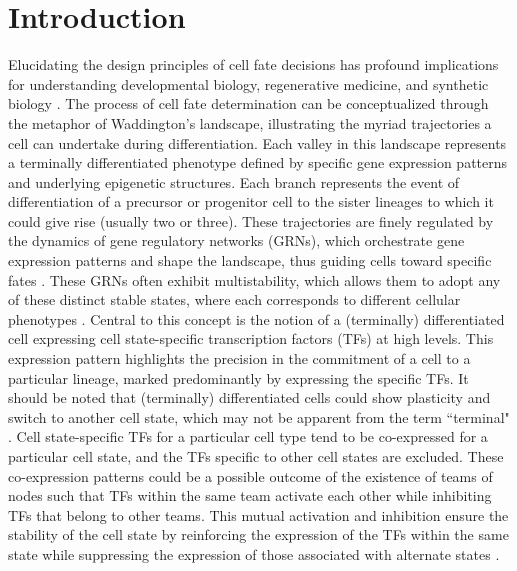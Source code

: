 \documentclass[11pt,a4paper]{article}
\theoremstyle{definition}
\theoremstyle{remark}
\begin{document}
\section{Introduction}
Elucidating the design principles of cell fate decisions has profound implications for understanding developmental biology, regenerative medicine, and synthetic biology \parencite{saez_dynamical_2022, zhou_understanding_2011, qian_programming_2018}. The process of cell fate determination can be conceptualized through the metaphor of Waddington's landscape, illustrating the myriad trajectories a cell can undertake during differentiation. Each valley in this landscape represents a terminally differentiated phenotype defined by specific gene expression patterns and underlying epigenetic structures. Each branch represents the event of differentiation of a precursor or progenitor cell to the sister lineages to which it could give rise (usually two or three). These trajectories are finely regulated by the dynamics of gene regulatory networks (GRNs), which orchestrate gene expression patterns and shape the landscape, thus guiding cells toward specific fates \parencite{furusawa_dynamical-systems_2012, saez_statistically_2022}. These GRNs often exhibit multistability, which allows them to adopt any of these distinct stable states, where each corresponds to different cellular phenotypes \parencite{ghaffarizadeh_multistable_2014, guantes_multistable_2008}. Central to this concept is the notion of a (terminally) differentiated cell expressing cell state-specific transcription factors (TFs) at high levels. This expression pattern highlights the precision in the commitment of a cell to a particular lineage, marked predominantly by expressing the specific TFs. It should be noted that (terminally) differentiated cells could show plasticity and switch to another cell state, which may not be apparent from the term ``terminal" \parencite{alvarado_rethinking_2014}. Cell state-specific TFs for a particular cell type tend to be co-expressed for a particular cell state, and the TFs specific to other cell states are excluded. These co-expression patterns could be a possible outcome of the existence of teams of nodes such that TFs within the same team activate each other while inhibiting TFs that belong to other teams. This mutual activation and inhibition ensure the stability of the cell state by reinforcing the expression of the TFs within the same state while suppressing the expression of those associated with alternate states \parencite{hari_landscape_2022}.  
\end{document}
